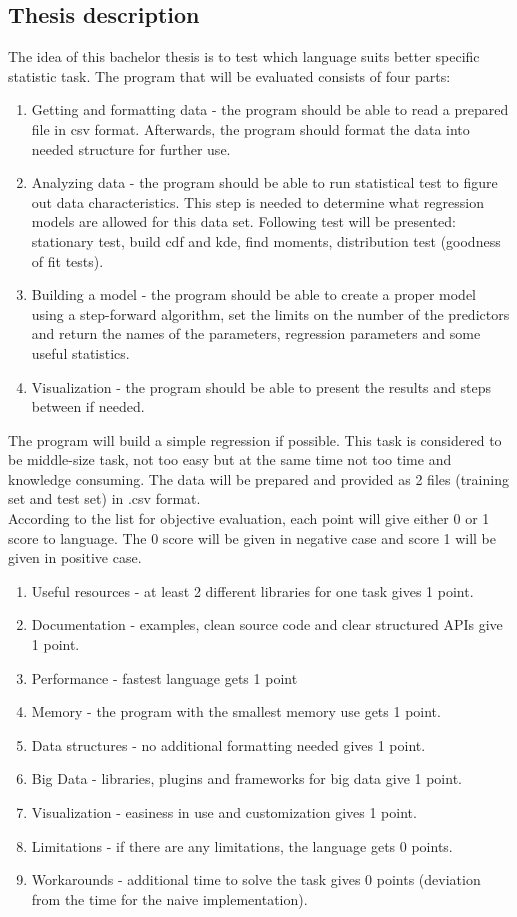 \documentclass{article}
\begin{document}
\subsection{Thesis description}
The idea of this bachelor thesis is to test which language suits better specific statistic task. 
The program that will be evaluated consists of four parts:
\begin{enumerate}
    \item Getting and formatting data - the program should be able to read a prepared file in csv format. Afterwards, the program should format the data into needed structure for further use.
    \item Analyzing data - the program should be able to run statistical test to figure out data characteristics. This step is needed to determine what regression models are allowed for this data set. Following test will be presented: stationary test, build cdf and kde, find moments, distribution test (goodness of fit tests).
    \item Building a model - the program should be able to create a proper model using a step-forward algorithm, set the limits on the number of the predictors and return the names of the parameters, regression parameters and some useful statistics.
    \item Visualization - the program should be able to present the results and steps between if needed.
\end{enumerate}
The program will build a simple regression if possible. This task is considered to be middle-size task, not too easy but at the same time not too time and knowledge consuming.
The data will be prepared and provided as 2 files (training set and test set) in .csv format.\\
According to the list for objective evaluation, each point will give either 0 or 1 score to language. The 0 score will be given in negative case and score 1 will be given in positive case.
\begin{enumerate}
    \item[] Useful resources - at least 2 different libraries for one task gives 1 point.
    \item[] Documentation - examples, clean source code and clear structured APIs give 1 point.
    \item[] Performance - fastest language gets 1 point
    \item[] Memory - the program with the smallest memory use gets 1 point.
    \item[] Data structures - no additional formatting needed gives 1 point.
    \item[] Big Data - libraries, plugins and frameworks for big data give 1 point.
    \item[] Visualization - easiness in use and customization gives 1 point.
    \item[] Limitations - if there are any limitations, the language gets 0 points.
    \item[] Workarounds - additional time to solve the task gives 0 points (deviation from the time for the naive implementation).
\end{enumerate}
\end{document}
